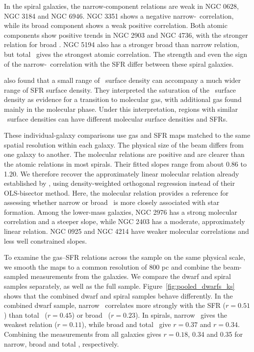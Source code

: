 In the spiral galaxies, the narrow-component relations are weak in NGC 0628, NGC 3184 and NGC 6946. NGC 3351 shows a negative narrow-\HI\ correlation, while its broad component shows a weak positive correlation. Both atomic components show positive trends in NGC 2903 and NGC 4736, with the stronger relation for broad \HI. NGC 5194 also has a stronger broad than narrow relation, but total \HI\ gives the strongest atomic correlation. The strength and even the sign of the narrow-\HI\ correlation with the SFR differ between these spiral galaxies.

\citet{Fbigiel2008} also found that a small range of \HI\ surface density can accompany a much wider range of SFR surface density. They interpreted the saturation of the \HI\ surface density as evidence for a transition to molecular gas, with additional gas found mainly in the molecular phase. Under this interpretation, regions with similar \HI\ surface densities can have different molecular surface densities and SFRs.

These individual-galaxy comparisons use gas and SFR maps matched to the same spatial resolution within each galaxy. The physical size of the beam differs from one galaxy to another. The molecular relations are positive and are clearer than the atomic relations in most spirals. Their fitted slopes range from about 0.86 to 1.20. We therefore recover the approximately linear molecular relation already established by \citet{Fbigiel2008}, using density-weighted orthogonal regression instead of their OLS-bisector method. Here, the molecular relation provides a reference for assessing whether narrow or broad \HI\ is more closely associated with star formation. Among the lower-mass galaxies, NGC 2976 has a strong molecular correlation and a steeper slope, while NGC 2403 has a moderate, approximately linear relation. NGC 0925 and NGC 4214 have weaker molecular correlations and less well constrained slopes.

To examine the gas--SFR relations across the sample on the same physical scale, we smooth the maps to a common resolution of 800 pc and combine the beam-sampled measurements from the galaxies. We compare the dwarf and spiral samples separately, as well as the full sample. Figure~\ref{fig:pooled_dwarfs_ks} shows that the combined dwarf and spiral samples behave differently. In the combined dwarf sample, narrow \HI\ correlates more strongly with the SFR ($r=0.51$) than total \HI\ ($r=0.45$) or broad \HI\ ($r=0.23$). In spirals, narrow \HI\ gives the weakest relation ($r=0.11$), while broad and total \HI\ give $r=0.37$ and $r=0.34$. Combining the measurements from all galaxies gives $r=0.18$, 0.34 and 0.35 for narrow, broad and total \HI, respectively.

